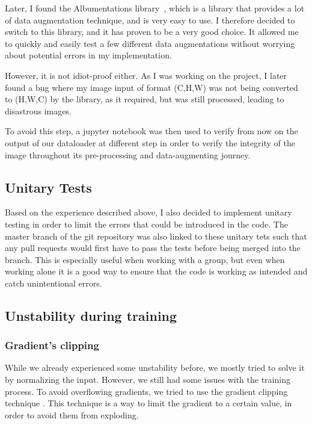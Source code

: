 \documentclass[11pt]{article}
\begin{document}
        Later, I found the Albumentations library~\cite{albumentations}, which is a library that provides a lot of data augmentation technique, and is very easy to use. I therefore decided to switch to this library, and it has proven to be a very good choice.
        It allowed me to quickly and easily test a few different data augmentations without worrying about potential errors in my implementation.

        However, it is not idiot-proof either. As I was working on the project, I later found a bug where my image input of format (C,H,W) was not being converted to (H,W,C) by the library, as it required, but was still processed, leading to disastrous images.

        To avoid this step, a jupyter notebook was then used to verify from now on the output of our dataloader at different step in order to verify the integrity of the image
        throughout its pre-processing and data-augmenting journey.

    \subsection{Unitary Tests}

            Based on the experience described above, I also decided to implement unitary testing in order to limit the errors
            that could be introduced in the code. The master branch of the git repository was also linked to these unitary tets such that
            any pull requests would first have to pass the tests before being merged into the branch. This is especially useful when working with a group,
            but even when working alone it is a good way to ensure that the code is working as intended and catch unintentional errors.


    \subsection{Unstability during training}

    \subsubsection{Gradient's clipping}

        While we already experienced some unstability before, we mostly tried to solve it by normalizing the input.
        However, we still had some issues with the training process. To avoid overflowing gradients, we tried to use the gradient clipping technique \cite{gradient_clipping}.
        This technique is a way to limit the gradient to a certain value, in order to avoid them from exploding.
\end{document}

